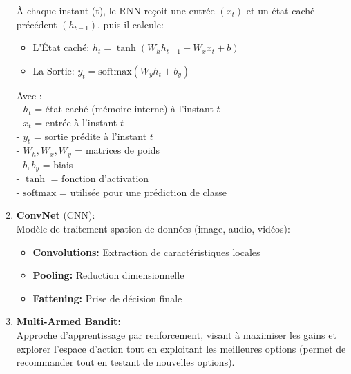 \documentclass{article}
\begin{document}
\begin{enumerate}
          À chaque instant (t), le RNN reçoit une entrée \((x_t)\) et un état caché précédent \((h_{t-1})\), puis il calcule:
          \begin{itemize}
              \item L'État caché: \(h_t = \tanh(W_h h_{t-1} + W_x x_t + b)\)
              \item  La Sortie: \(y_t = \text{softmax}(W_y h_t + b_y)\)
          \end{itemize}
          Avec :\\
          - \( h_t \) = état caché (mémoire interne) à l’instant \( t \)\\
          - \( x_t \) = entrée à l’instant \( t \)\\
          - \( y_t \) = sortie prédite à l’instant \( t \)\\
          - \( W_h, W_x, W_y \) = matrices de poids\\
          - \( b, b_y \) = biais\\
          - \( \tanh \) = fonction d’activation\\
          - \( \text{softmax} \) = utilisée pour une prédiction de classe\\

    \item \textbf{ConvNet} (CNN):\\
          Modèle de traitement spation de données (image, audio, vidéos):
          \begin{itemize}
              \item \textbf{Convolutions:} Extraction de caractéristiques locales
              \item \textbf{Pooling:} Reduction dimensionnelle
              \item \textbf{Fattening:} Prise de décision finale
          \end{itemize}

    \item \textbf{Multi-Armed Bandit: }\\
          Approche d'apprentissage par renforcement, visant à maximiser les gains et explorer l'espace d'action tout en exploitant les meilleures options (permet de recommander tout en testant de nouvelles options).


\end{enumerate}
\end{document}
